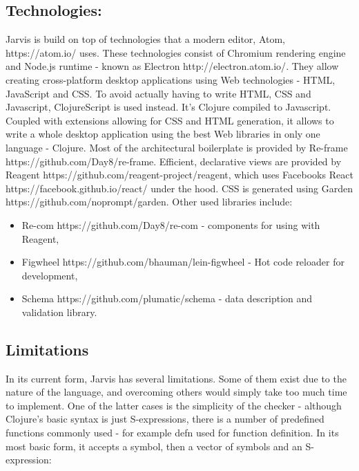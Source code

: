 \documentclass[11pt]{scrartcl}
\begin{document}
\subsection{Technologies:}
Jarvis is build on top of technologies that a modern editor, Atom, {https://atom.io/} uses. These technologies consist of Chromium rendering engine and Node.js runtime - known as Electron {http://electron.atom.io/}. They allow creating cross-platform desktop applications using Web technologies - HTML, JavaScript and CSS. To avoid actually having to write HTML, CSS and Javascript, ClojureScript is used instead. It’s Clojure compiled to Javascript. Coupled with extensions allowing for CSS and HTML generation, it allows to write a whole desktop application using the best Web libraries in only one language - Clojure. 
Most of the architectural boilerplate is provided by Re-frame {https://github.com/Day8/re-frame}. Efficient, declarative views are provided by Reagent  {https://github.com/reagent-project/reagent}, which uses Facebooks React {https://facebook.github.io/react/} under the hood. CSS is generated using Garden {https://github.com/noprompt/garden}. Other used libraries include:
\begin{itemize}
  \item Re-com {https://github.com/Day8/re-com} - components for using with Reagent,
  \item Figwheel {https://github.com/bhauman/lein-figwheel} - Hot code reloader for development,
  \item Schema {https://github.com/plumatic/schema} - data description and validation library.
\end{itemize}

\subsection{Limitations}
In its current form, Jarvis has several limitations. Some of them exist due to the nature of the language, and overcoming others would simply take too much time to implement. One of the latter cases is the simplicity of the checker - although Clojure’s basic syntax is just S-expressions, there is a number of predefined functions commonly used - for example defn used for function definition. In its most basic form, it accepts a symbol, then a vector of symbols and an S-expression:
\end{document}
